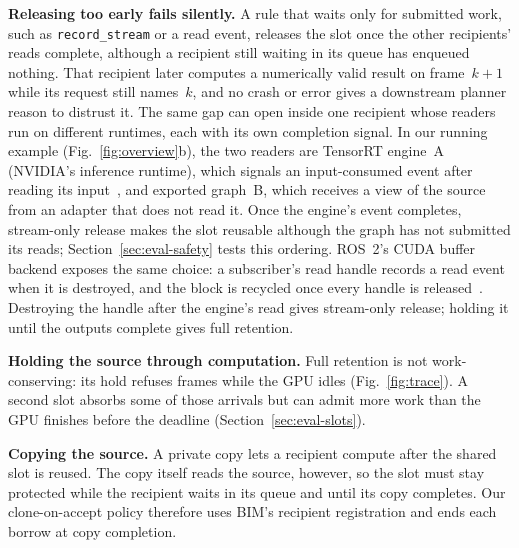 \documentclass[conference]{IEEEtran}
\newcommand{\code}[1]{\texttt{#1}}
\begin{document}
\textbf{Releasing too early fails silently.} A rule that waits only for submitted work, such as \code{record\_stream} or a read event, releases the slot once the other recipients' reads complete, although a recipient still waiting in its queue has enqueued nothing. That recipient later computes a numerically valid result on frame~$k{+}1$ while its request still names~$k$, and no crash or error gives a downstream planner reason to distrust it. The same gap can open inside one recipient whose readers run on different runtimes, each with its own completion signal. In our running example (Fig.~\ref{fig:overview}b), the two readers are TensorRT engine~A (NVIDIA's inference runtime), which signals an input-consumed event after reading its input~\cite{tensorrt}, and exported graph~B, which receives a view of the source from an adapter that does not read it. Once the engine's event completes, stream-only release makes the slot reusable although the graph has not submitted its reads; Section~\ref{sec:eval-safety} tests this ordering. ROS~2's CUDA buffer backend exposes the same choice: a subscriber's read handle records a read event when it is destroyed, and the block is recycled once every handle is released~\cite{cudabackend}. Destroying the handle after the engine's read gives stream-only release; holding it until the outputs complete gives full retention.

\textbf{Holding the source through computation.} Full retention is not work-conserving: its hold refuses frames while the GPU idles (Fig.~\ref{fig:trace}). A second slot absorbs some of those arrivals but can admit more work than the GPU finishes before the deadline (Section~\ref{sec:eval-slots}).

\textbf{Copying the source.} A private copy lets a recipient compute after the shared slot is reused. The copy itself reads the source, however, so the slot must stay protected while the recipient waits in its queue and until its copy completes. Our clone-on-accept policy therefore uses BIM's recipient registration and ends each borrow at copy completion.
\end{document}
